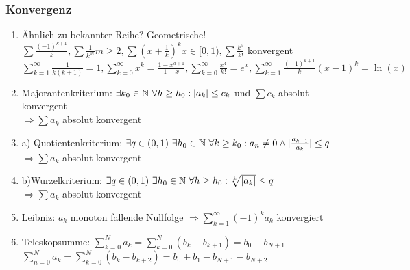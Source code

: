 \subsubsection{Konvergenz}
\begin{enumerate}[label=\arabic*)]
    \item Ähnlich zu bekannter Reihe? Geometrische!\\
    $\sum \frac{(-1)^{k+1}}{k}, \sum \frac{1}{k^m} m \geq 2, \sum (x + \frac{1}{k})^k x\in [0, 1), \sum \frac{k^5}{k!}$ konvergent\\
    $\sum_{k=1}^{\infty} \frac{1}{k (k+1)} = 1, \sum_{k=0}^{\infty} x^k = \frac{1 - x^{a +1}}{1-x}, \sum_{k=0}^{\infty} \frac{x^4}{k!} = e^x, \sum_{k=1}^{\infty} \frac{(-1)^{k+1}}{k} (x - 1)^k = \ln(x)$
    \item Majorantenkriterium: $\exists k_0 \in \mathbb N \ \forall h \geq h_0: |a_k| \leq c_k$ und $\sum c_k$ absolut konvergent\\
    $\Rightarrow \sum a_k$ absolut konvergent
    \item a) Quotientenkriterium: $\exists q \in (0, 1) \ \exists h_0 \in \mathbb N \ \forall k \geq k_0: a_n \neq 0 \land |\frac{a_{k+1}}{a_k}| \leq q$\\
    $\Rightarrow \sum a_k$ absolut konvergent
    \setcounter{enumi}{3}
    \item b)Wurzelkriterium: $\exists q \in (0, 1) \ \exists h_0 \in \mathbb N \ \forall h \geq h_0: \sqrt[k]{|a_k|} \leq q$\\
    $\Rightarrow \sum a_k$ absolut konvergent
    \item Leibniz: $a_k$ monoton fallende Nullfolge $\Rightarrow \sum_{k=1}^{\infty}(-1)^k a_k$ konvergiert
    \item Teleskopsumme: $\sum_{k=0}^{N} a_k = \sum_{k=0}^{N} (b_k - b_{k+1}) = b_0 - b_{N +1}$\\
    $\sum_{n = 0}^{N} a_k = \sum_{k=0}^{N} (b_k - b_{k+2}) = b_0 + b_1 - b_{N+1} - b_{N + 2}$
\end{enumerate}


